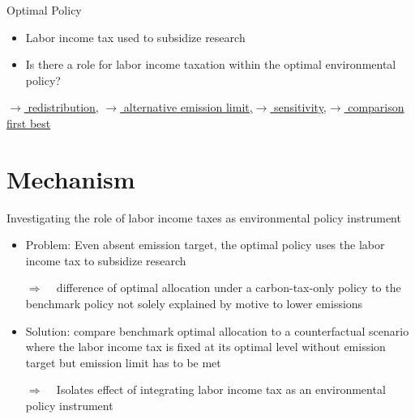 \documentclass[11pt,aspectratio=169]{beamer}
\newcommand{\ar}{$\Rightarrow$ \ }
\begin{document}
\begin{frame}{Optimal Policy}
\vspace{3mm}
\begin{block}{}
	\begin{itemize}
		\item Labor income tax used to subsidize research
		\item Is there a role for labor income taxation within the optimal environmental policy?
	\end{itemize}
\end{block}	
\hypertarget{backOPT}{}
\vspace{-4mm}
\hfill

\hyperlink{Redis}{\tiny{$\rightarrow$ redistribution,}}
\hyperlink{altems}{\tiny{$\rightarrow$ alternative emission limit,}}\hyperlink{sensphi}{\tiny{$\rightarrow$ sensitivity,}}\hyperlink{compfb}{\tiny{$\rightarrow$ comparison first best}}
\end{frame}


\section*{Mechanism}

\begin{frame}{Investigating the role of labor income taxes as environmental policy instrument}


\begin{itemize}
	\item 	\alert{Problem: Even absent emission target, the optimal policy uses the labor income tax to subsidize research}
	\vspace{3mm}
	\item[\ar] difference of optimal allocation under a carbon-tax-only policy to the benchmark policy not solely explained by motive to lower emissions %
	\vspace{3mm}
	\item Solution: compare benchmark optimal allocation to a counterfactual scenario where the labor income tax is fixed at its optimal level without emission target but emission limit has to be met
	\vspace{3mm}
	\item[\ar] Isolates effect of integrating labor income tax as an environmental policy instrument 
\end{itemize}
%
\end{frame}
\end{document}
